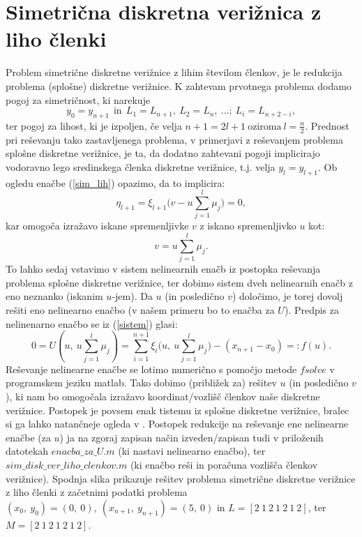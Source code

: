 \documentclass{article}
\begin{document}
\section{Simetrična diskretna verižnica z liho členki}
Problem simetrične diskretne verižnice z lihim številom členkov,  je le redukcija problema (splošne) diskretne verižnice.
\newline
K zahtevam prvotnega problema dodamo pogoj za simetričnost, ki narekuje 
$$ 
y_0 = y_{n+1}~~\text{in}~~L_1 = L_{n+1},~L_2 = L_n,~\dots;~L_i = L_{n+2 - i},
$$
ter pogoj za lihost, ki je izpoljen, če velja $n + 1 = 2 l +1~\text{oziroma}~l = \frac{n}{2}$.
\newline
Prednost pri reševanju tako zastavljenega problema, v primerjavi z reševanjem problema splošne diskretne verižnice, je ta, da dodatno zahtevani pogoji implicirajo vodoravno lego sredinskega členka diskretne verižnice, t.j. velja $y_{l} = y_{l+1}$.
Ob ogledu enačbe (\ref{sim_lih}) opazimo, da to implicira:
$$
    \eta_{l+1} = \xi_{l+1} \bigg(v - u \sum_{j = 1}^{l} \mu_{j} \bigg) = 0, 
$$
kar omogoča izražavo iskane spremenljivke $v$ z iskano spremenljivko $u$ kot:
$$
v = u \sum_{j = 1}^{l} \mu_{j}.
$$
To lahko sedaj vstavimo v sistem nelinearnih enačb iz postopka reševanja problema splošne diskretne verižnice, ter dobimo sistem dveh nelinearnih enačb z eno neznanko (iskanim $u$-jem). 
Da $u$ (in posledično $v$) določimo, je torej dovolj rešiti eno nelinearno enačbo (v našem primeru bo to enačba za $U$).
\newline
Predpis za nelinenarno enačbo se iz (\ref{sistem}) glasi:
$$
0 = U(u,~u \sum_{j = 1}^{l} \mu_{j}) = \sum_{i=1}^{n+1} \xi_{i}\big(u,~u \sum_{j = 1}^{l} \mu_{j}\big)-(x_{n+1}-x_{0}) =: f(u).
$$
Reševanje nelinearne enačbe se lotimo numerično s pomočjo metode $fsolve$ v programskem jeziku matlab.
Tako dobimo (približek za) rešitev $u$ (in posledično $v$), ki nam bo omogočala izražavo koordinat/vozlišč členkov naše diskretne verižnice.
Postopek je povsem enak tistemu iz splošne diskretne verižnice, bralec si ga lahko natančneje ogleda v \cite{clanek}.
\newline
Postopek redukcije na reševanje ene nelinearne enačbe (za $u$) ja na zgoraj zapisan način izveden/zapisan tudi v priloženih datotekah $enacba\_za\_U.m$ (ki nastavi nelinearno enačbo), ter $sim\_disk\_ver\_liho\_clenkov.m$ (ki enačbo reši in poračuna vozlišča členkov verižnice).
\newline
Spodnja slika prikazuje rešitev problema simetrične diskretne verižnice z liho členki z začetnimi podatki problema $(x_0,~ y_0) = (0,~0),~(x_{n+1},~y_{n+1}) = (5,~0)$ in $L = [2~1~2~1~2~1~2]$, ter $M = [2~1~2~1~2~1~2]$. 
\end{document}
